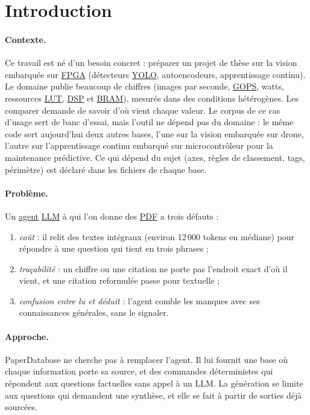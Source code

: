 \documentclass[11pt,a4paper]{article}
\newcommand{\gl}[2]{\hyperlink{gl:#1}{\textcolor{glcolor}{#2}}}
\begin{document}
\clearpage
\tableofcontents
\clearpage

\section{Introduction}

\paragraph{Contexte.} Ce travail est né d'un besoin concret : préparer un projet de thèse
sur la vision embarquée sur \gl{FPGA}{FPGA} (détecteurs \gl{YOLO}{YOLO}, autoencodeurs, apprentissage continu).
Le domaine publie beaucoup de chiffres (images par seconde, \gl{GOPS}{GOPS}, watts, ressources \gl{LUT}{LUT}, \gl{DSP}{DSP}
et \gl{BRAM}{BRAM}), mesurés dans des conditions hétérogènes. Les comparer demande de savoir d'où vient
chaque valeur. Le corpus de ce cas d'usage sert de banc d'essai, mais l'outil ne dépend pas
du domaine : le même code sert aujourd'hui deux autres bases, l'une sur la vision embarquée
sur drone, l'autre sur l'apprentissage continu embarqué sur microcontrôleur pour la
maintenance prédictive. Ce qui dépend du sujet (axes, règles de classement, tags, périmètre)
est déclaré dans les fichiers de chaque base.

\paragraph{Problème.} Un \gl{agent}{agent} \gl{LLM}{LLM} à qui l'on donne des \gl{PDF}{PDF} a trois défauts :
\begin{enumerate}
  \item \emph{coût} : il relit des textes intégraux (environ 12\,000 tokens en médiane) pour
    répondre à une question qui tient en trois phrases ;
  \item \emph{traçabilité} : un chiffre ou une citation ne porte pas l'endroit exact d'où
    il vient, et une citation reformulée passe pour textuelle ;
  \item \emph{confusion entre lu et déduit} : l'agent comble les manques avec ses
    connaissances générales, sans le signaler.
\end{enumerate}

\paragraph{Approche.} PaperDatabase ne cherche pas à remplacer l'agent. Il lui fournit une
base où chaque information porte sa source, et des commandes déterministes qui répondent aux
questions factuelles sans appel à un LLM. La génération se limite aux questions qui
demandent une synthèse, et elle se fait à partir de sorties déjà sourcées.
\end{document}
